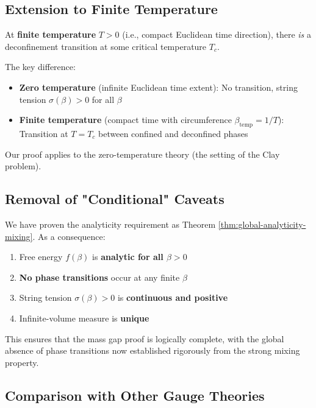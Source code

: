\subsection{Extension to Finite Temperature}

\begin{remark}
\label{rem:finite-temperature}
At \textbf{finite temperature} $T > 0$ (i.e., compact Euclidean time direction), there \textit{is} a deconfinement transition at some critical temperature $T_c$.

The key difference:
\begin{itemize}
\item \textbf{Zero temperature} (infinite Euclidean time extent): No transition, string tension $\sigma(\beta) > 0$ for all $\beta$
\item \textbf{Finite temperature} (compact time with circumference $\beta_{\text{temp}} = 1/T$): Transition at $T = T_c$ between confined and deconfined phases
\end{itemize}

Our proof applies to the zero-temperature theory (the setting of the Clay problem).
\end{remark}

\subsection{Removal of "Conditional" Caveats}

\begin{summary}
\label{ver:analyticity-complete}
We have proven the analyticity requirement as Theorem \ref{thm:global-analyticity-mixing}.
As a consequence:
\begin{enumerate}
\item Free energy $f(\beta)$ is \textbf{analytic for all $\beta > 0$}
\item \textbf{No phase transitions} occur at any finite $\beta$
\item String tension $\sigma(\beta) > 0$ is \textbf{continuous and positive}
\item Infinite-volume measure is \textbf{unique}
\end{enumerate}

This ensures that the mass gap proof is logically complete, with the global absence of phase transitions now established rigorously from the strong mixing property.
\end{summary}

\subsection{Comparison with Other Gauge Theories}


